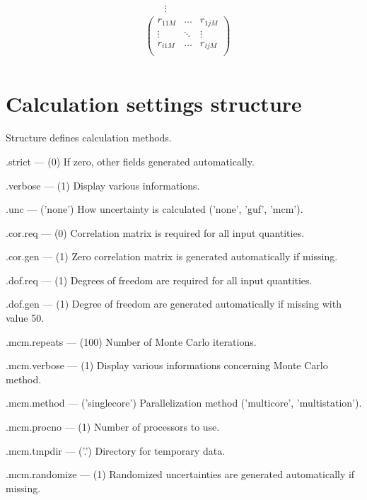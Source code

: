 \documentclass[12pt,a4paper,oneside]{report} %
\begin{document}
\begin{eqnarray*}
                            & \qquad\vdots                        \\
                            & \left(    \begin{array}{ccc}
                                                r_{11M}  & \hdots & r_{1jM} \\
                                                \vdots  & \ddots & \vdots \\
                                                r_{i1M}  & \hdots & r_{ijM} \\
                                        \end{array}\right) \\
\end{eqnarray*}

\section{Calculation settings structure} %
\label{structcalcset}
Structure defines calculation methods.
\begin{tightdesc}
        \item [\textsf{.strict}] ---  (0) If zero, other fields generated automatically.
        \item [\textsf{.verbose}] ---  (1) Display various informations.
        \item [\textsf{.unc}] ---  ('none') How uncertainty is calculated ('none', 'guf', 'mcm').
        \item [\textsf{.cor.req}] ---  (0) Correlation matrix is required for all input quantities.
        \item [\textsf{.cor.gen}] ---  (1) Zero correlation matrix is generated automatically if missing.
        \item [\textsf{.dof.req}] ---  (1) Degrees of freedom are required for all input quantities.
        \item [\textsf{.dof.gen}] ---  (1) Degree of freedom are generated automatically if missing with value 50.
        \item [\textsf{.mcm.repeats}] ---  (100) Number of Monte Carlo iterations.
        \item [\textsf{.mcm.verbose}] ---  (1) Display various informations concerning Monte Carlo method.
        \item [\textsf{.mcm.method}] ---  ('singlecore') Parallelization method ('multicore', 'multistation').
        \item [\textsf{.mcm.procno}] ---  (1) Number of processors to use.
        \item [\textsf{.mcm.tmpdir}] ---  ('.') Directory for temporary data.
        \item [\textsf{.mcm.randomize}] ---  (1) Randomized uncertainties are generated automatically if missing.
\end{tightdesc}
\end{document}
